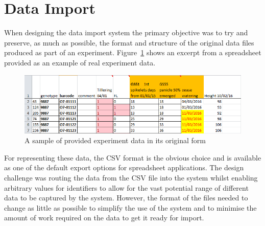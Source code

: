 \section{Data Import}\label{dataimp}

When designing the data import system the primary objective was to try and preserve, as much as possible, the format and structure of the original data files produced as part of an experiment. Figure~\ref{fig:data1} shows an excerpt from a spreadsheet provided as an example of real experiment data. 

\begin{figure}[H]
    \centering
    \includegraphics[width=\textwidth]{images/design/data1}
    \caption{A sample of provided experiment data in its original form}
    \label{fig:data1}
\end{figure}

For representing these data, the CSV format is the obvious choice and is available as one of the default export options for spreadsheet applications. The design challenge was routing the data from the CSV file into the system whilst enabling arbitrary values for identifiers to allow for the vast potential range of different data to be captured by the system. However, the format of the files needed to change as little as possible to simplify the use of the system and to minimise the amount of work required on the data to get it ready for import.


